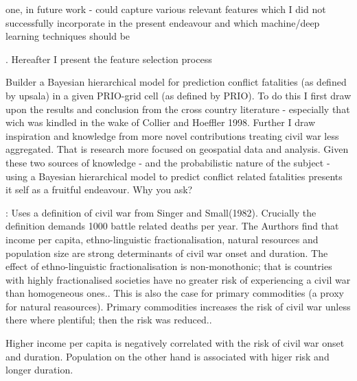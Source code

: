 




one, in future work - could capture various relevant features which I did not successfully incorporate in the present endeavour and which machine/deep learning techniques should be      


. Hereafter I present  the feature selection process 



Builder a Bayesian hierarchical model for prediction conflict fatalities (as defined by upsala) in a given PRIO-grid cell (as defined by PRIO). To do this I first draw upon the results and conclusion from the cross country literature - especially that wich was kindled in the wake of Collier and Hoeffler 1998. Further I draw inspiration and knowledge from more novel contributions treating civil war less aggregated. That is research more focused on geospatial data and analysis. Given these two sources of knowledge - and the probabilistic nature of the subject - using a Bayesian hierarchical model to predict conflict related fatalities presents it self as a fruitful endeavour. Why you ask?





\cite{Collier_Hoeffler_1998}: Uses a definition of civil war from Singer and Small(1982). Crucially the definition demands 1000 battle related deaths per year. The Aurthors find that income per capita, ethno-linguistic fractionalisation, natural resources and population size are strong determinants of civil war onset and duration. The effect of ethno-linguistic fractionalisation is non-monothonic; that is countries with highly fractionalised societies have no greater risk of experiencing a civil war than homogeneous ones.\citep[563]{Collier_Hoeffler_1998}. This is also the case for primary commodities (a proxy for natural reasources). Primary commodities increases the risk of civil war unless there where plentiful; then the risk was reduced.\citep[569]{Collier_Hoeffler_1998}.\par

Higher income per capita is negatively correlated with the risk of civil war onset and duration\citep[568]{Collier_Hoeffler_1998}. Population on the other hand is associated with higer risk and longer duration\citep[569]{Collier_Hoeffler_1998}.\par

